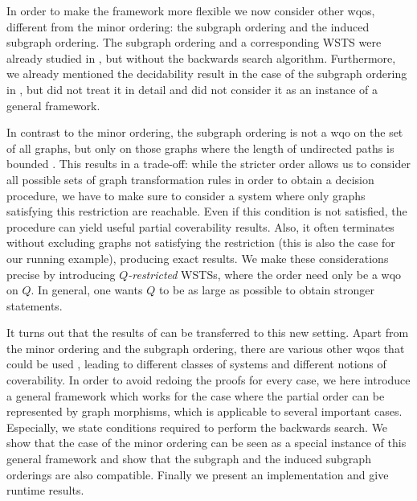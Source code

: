 \documentclass{llncs}
\begin{document}
In order to make the framework more flexible we now consider other
wqos, different from the minor ordering: the subgraph ordering and the
induced subgraph ordering. The subgraph ordering and a corresponding
WSTS were already studied in \cite{BKWZ:2013}, but without the
backwards search algorithm. Furthermore, we already mentioned the
decidability result in the case of the subgraph ordering in
\cite{bdkss:undecidability-gts}, but did not treat it in detail and did
not consider it as an instance of a general framework.

In contrast to the minor ordering, the subgraph ordering is not a wqo on
the set of all graphs, but only on those graphs where the length of undirected
paths is bounded \cite{ding:subgraphs-wqo}. This results in a trade-off: while 
the stricter order allows us to consider all possible sets of graph 
transformation rules in order to obtain a decision procedure, we have to make 
sure to consider a system where only graphs satisfying this restriction are
reachable. Even if this condition is not satisfied, the procedure can
yield useful partial coverability results.  Also, it often terminates
without excluding graphs not satisfying the restriction (this is also
the case for our running example), producing exact results.  We make
these considerations precise by introducing \emph{$Q$-restricted} WSTSs, where 
the order need only be a wqo on $Q$. In general, one wants $Q$ to be as large 
as possible to obtain stronger statements.

It turns out that the results of \cite{JK08} can be transferred to
this new setting. Apart from the minor ordering and the subgraph
ordering, there are various other wqos that could be used
\cite{fhr:wqo-bounded-treewidth}, leading to different classes of
systems and different notions of coverability. In order to avoid
redoing the proofs for every case, we here introduce a general
framework which works for the case where the partial order can be
represented by graph morphisms, which is applicable to several
important cases.  Especially, we state conditions required to perform
the backwards search. We show that the case of the minor ordering can
be seen as a special instance of this general framework and show that
the subgraph and the induced subgraph orderings are also compatible.
Finally we present an implementation and give runtime results.
\end{document}
